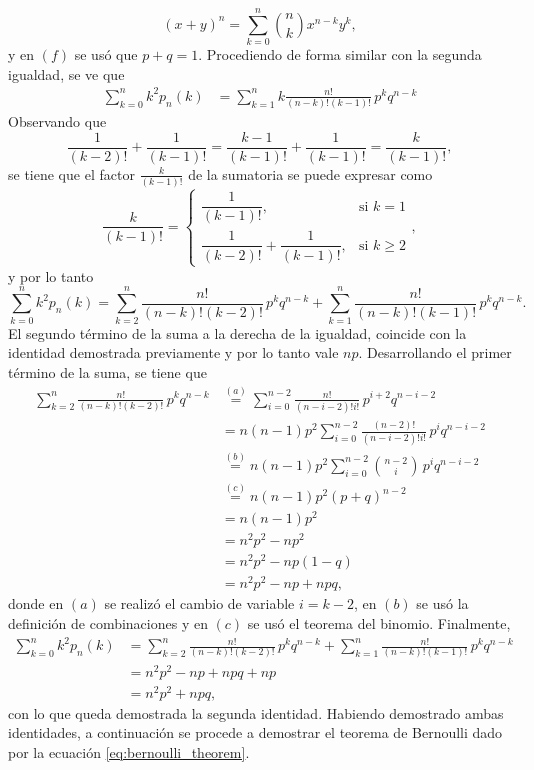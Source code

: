 \documentclass[a4paper]{report}
\begin{document}
\begin{equation}\label{eq:binomial_theorem}
 (x+y)^n=\sum_{k=0}^{n}\binom{n}{k}x^{n-k}y^{k},
\end{equation}
y en \((f)\) se usó que \(p+q=1\). Procediendo de forma similar con la segunda igualdad, se ve que
\begin{align*}
 \sum_{k=0}^{n}k^2p_n(k)&=\sum_{k=1}^{n}k\frac{n!}{(n-k)!(k-1)!}\,p^kq^{n-k}
\end{align*}
Observando que
\[
 \frac{1}{(k-2)!}+\frac{1}{(k-1)!}=\frac{k-1}{(k-1)!}+\frac{1}{(k-1)!}=\frac{k}{(k-1)!},
\]
se tiene que el factor \(\frac{k}{(k-1)!}\) de la sumatoria se puede expresar como
\[
 \frac{k}{(k-1)!}=
 \left\{\begin{array}{ll}
  \dfrac{1}{(k-1)!}, & \textrm{si }k = 1 \\
  \dfrac{1}{(k-2)!}+\dfrac{1}{(k-1)!}, & \textrm{si }k\geq 2
 \end{array} \right.,
\]
y por lo tanto
\[
 \sum_{k=0}^{n}k^2p_n(k)=\sum_{k=2}^{n}\frac{n!}{(n-k)!(k-2)!}\,p^kq^{n-k}+\sum_{k=1}^{n}\frac{n!}{(n-k)!(k-1)!}\,p^kq^{n-k}.
\]
El segundo término de la suma a la derecha de la igualdad, coincide con la identidad demostrada previamente y por lo tanto vale \(np\). Desarrollando el primer término de la suma, se tiene que
\begin{align*}
 \sum_{k=2}^{n}\frac{n!}{(n-k)!(k-2)!}\,p^kq^{n-k}&\overset{(a)}{=}\sum_{i=0}^{n-2}\frac{n!}{(n-i-2)!i!}\,p^{i+2}q^{n-i-2}\\
  &=n(n-1)p^2\sum_{i=0}^{n-2}\frac{(n-2)!}{(n-i-2)!i!}\,p^iq^{n-i-2}\\
  &\overset{(b)}{=}n(n-1)p^2\sum_{i=0}^{n-2}\binom{n-2}{i}\,p^iq^{n-i-2}\\
  &\overset{(c)}{=}n(n-1)p^2(p+q)^{n-2}\\
  &=n(n-1)p^2\\
  &=n^2p^2-np^2\\
  &=n^2p^2-np(1-q)\\
  &=n^2p^2-np+npq,
\end{align*}
donde en \((a)\) se realizó el cambio de variable \(i=k-2\), en \((b)\) se usó la definición de combinaciones y en \((c)\) se usó el teorema del binomio.
Finalmente,
\begin{align*}
 \sum_{k=0}^{n}k^2p_n(k)&=\sum_{k=2}^{n}\frac{n!}{(n-k)!(k-2)!}\,p^kq^{n-k}+\sum_{k=1}^{n}\frac{n!}{(n-k)!(k-1)!}\,p^kq^{n-k}\\
 &=n^2p^2-np+npq+np\\
 &=n^2p^2+npq,
\end{align*}
con lo que queda demostrada la segunda identidad. Habiendo demostrado ambas identidades, a continuación se procede a demostrar el teorema de Bernoulli dado por la ecuación \ref{eq:bernoulli_theorem}.
\end{document}
